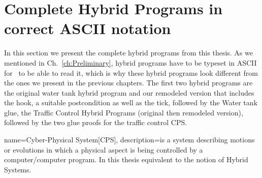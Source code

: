 \section{Complete Hybrid Programs in correct ASCII notation}
\label{app:sec:pdfs}

In this section we present the complete hybrid programs from this thesis. As we mentioned in Ch.~\ref{ch:Preliminary}, hybrid programs have to be typeset in ASCII for \keym~to be able to read it, which is why these hybrid programs look different from the ones we present in the previous chapters. The first two hybrid programs are the original water tank hybrid program and our remodeled version that includes the hook, a suitable postcondition as well as the tick, followed by the Water tank glue, the Traffic Control Hybrid Programs (original then remodeled version), followed by the two glue proofs for the traffic control CPS.







 {
 name=Cyber-Physical System[CPS],
 description={is a system describing motions or evolutions in which a physical aspect is being controlled by a computer/computer program. In this thesis equivalent to the notion of Hybrid Systems.}
}




